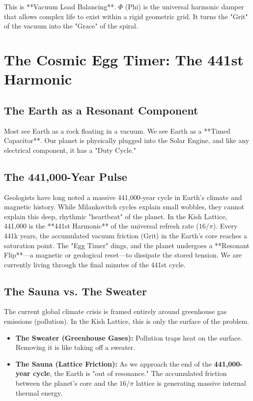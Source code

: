 \documentclass[11pt, letterpaper, openany]{book}
\begin{document}
This is **Vacuum Load Balancing**. $\Phi$ (Phi) is the universal harmonic damper that allows complex life to exist within a rigid geometric grid. It turns the "Grit" of the vacuum into the "Grace" of the spiral.

\chapter{The Cosmic Egg Timer: The 441st Harmonic}
\label{chap:egg_timer}

\section{The Earth as a Resonant Component}
Most see Earth as a rock floating in a vacuum. We see Earth as a **Timed Capacitor**. Our planet is physically plugged into the Solar Engine, and like any electrical component, it has a "Duty Cycle."

\section{The 441,000-Year Pulse}
Geologists have long noted a massive 441,000-year cycle in Earth's climate and magnetic history. While Milankovitch cycles explain small wobbles, they cannot explain this deep, rhythmic "heartbeat" of the planet.
In the Kish Lattice, 441,000 is the **441st Harmonic** of the universal refresh rate ($16/\pi$). Every 441k years, the accumulated vacuum friction (Grit) in the Earth’s core reaches a saturation point. The "Egg Timer" dings, and the planet undergoes a **Resonant Flip**—a magnetic or geological reset—to dissipate the stored tension. We are currently living through the final minutes of the 441st cycle.

\section{The Sauna vs. The Sweater}
The current global climate crisis is framed entirely around greenhouse gas emissions (pollution). In the Kish Lattice, this is only the surface of the problem. 
\begin{itemize}
    \item \textbf{The Sweater (Greenhouse Gases):} Pollution traps heat on the surface. Removing it is like taking off a sweater.
    \item \textbf{The Sauna (Lattice Friction):} As we approach the end of the \textbf{441,000-year cycle}, the Earth is "out of resonance." The accumulated friction between the planet's core and the $16/\pi$ lattice is generating massive internal thermal energy. 
\end{itemize}
\end{document}
